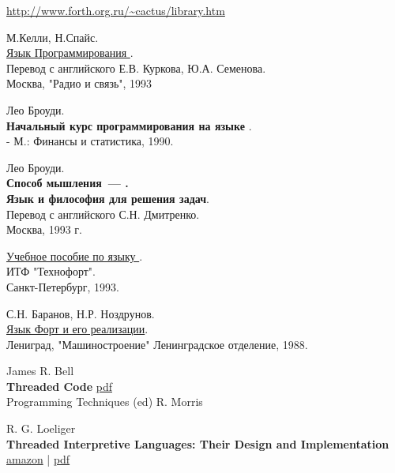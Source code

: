 \clearpage
{}\secdown

\begin{thebibliography}{99}

\secrel{\F}

    \url{http://www.forth.org.ru/~cactus/library.htm}

    М.Келли, Н.Спайс.\\
    \href{http://www.forth.org.ru/~cactus/files/kelly.rar}{Язык Программирования \F}.\\
    Перевод с английского Е.В. Куркова, Ю.А. Семенова.\\
    Москва, "Радио и связь", 1993

    Лео Броуди.\\
    \textbf{Начальный курс программирования на языке \F}.\\
    - М.: Финансы и статистика, 1990.

    Лео Броуди.\\
    \textbf{Способ мышления\ --- \F.\\Язык и философия для решения задач}.\\
    Перевод с английского С.Н. Дмитренко.\\
    Москва, 1993 г.

    \href{http://www.forth.org.ru/~TechnoForth/book.rar}{Учебное пособие по языку \F}.\\
    ИТФ "Технофорт".\\
    Санкт-Петербург, 1993.

    \secdown{}

    С.Н. Баранов, Н.Р. Ноздрунов.\\
    \href{http://www.forth.org.ru/~cactus/files/baranov2.rar}{Язык Форт и его реализации}.\\
    Лениград, "Машиностроение" Ленинградское отделение, 1988.

    James R. Bell\\
    \textbf{Threaded Code}
    \href{http://home.claranet.nl/users/mhx/Forth_Bell.pdf}{pdf}\\
    Programming Techniques (ed) R. Morris

    R. G. Loeliger\\
    \textbf{Threaded Interpretive Languages: Their Design and Implementation}\\
    \href{https://www.amazon.com/Threaded-Interpretive-Languages-Design-Implementation/dp/007038360X}{amazon} |
    \href{http://sinclairql.speccy.org/archivo/docs/books/Threaded_interpretive_languages.pdf}{pdf}


\end{thebibliography}
